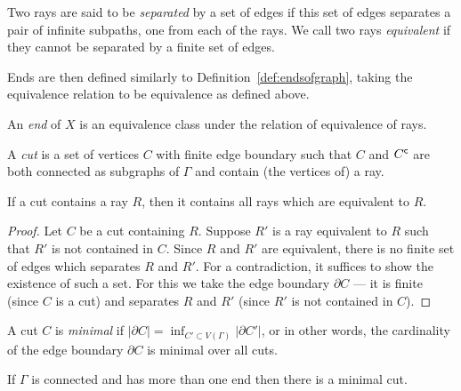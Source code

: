 \begin{definition}
Two rays are said to be \emph{separated} by a set of edges if this set of edges separates a pair of infinite subpaths, one from each of the rays. We call two rays \emph{equivalent} if they cannot be separated by a finite set of edges.
\end{definition}

Ends are then defined similarly to Definition~\ref{def:endsofgraph}, taking the equivalence relation to be equivalence as defined above. %

\begin{definition}
    An \emph{end} of \(X\) is an equivalence class under the relation of equivalence of rays.  
\end{definition}

\begin{definition}
 A \emph{cut} is a set of vertices \(C\) with finite edge boundary such that \(C\) and \({C}^{\mathsf{c}}\) are both connected as subgraphs of \(\Gamma\) and contain (the vertices of) a ray.
\end{definition}

\begin{proposition}
    \label{prop:ray}
     If a cut contains a ray \(R\), then it contains all rays which are equivalent to \(R\).
\end{proposition}

\begin{proof}
    Let \(C\) be a cut containing \(R\). Suppose \(R'\) is a ray equivalent to \(R\) such that \(R'\) is not contained in \(C\).
    Since \(R\) and \(R'\) are equivalent, there is no finite set of edges which separates \(R\) and \(R'\). For a contradiction, it suffices to show the existence of such a set. For this we take the edge boundary \(\partial C\) --- it is finite (since \(C\) is a cut) and separates \(R\) and \(R'\) (since \(R'\) is not contained in \(C\)). 
\end{proof}

\begin{definition}
    A cut \(C\) is \emph{minimal} if 
    \(|\partial C| = \inf_{C' \subset V(\Gamma)}{|\partial C'|}\), or in other words,
    the cardinality of the edge boundary \(\partial C\) is minimal over all cuts.
\end{definition}
\begin{lemma}
     If \(\Gamma\) is connected and has more than one end then there is a minimal cut.
\end{lemma}

